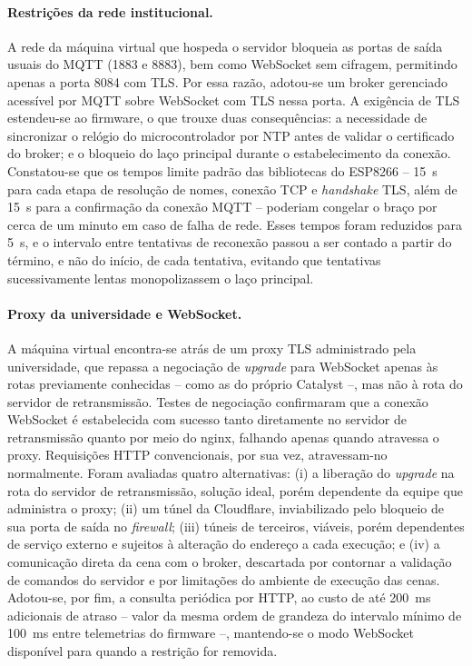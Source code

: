 \documentclass[12pt]{article}
\begin{document}
\paragraph{Restrições da rede institucional.} A rede da máquina virtual que hospeda o servidor bloqueia as portas de saída usuais do MQTT (1883 e 8883), bem como WebSocket sem cifragem, permitindo apenas a porta 8084 com TLS. Por essa razão, adotou-se um broker gerenciado acessível por MQTT sobre WebSocket com TLS nessa porta. A exigência de TLS estendeu-se ao firmware, o que trouxe duas consequências: a necessidade de sincronizar o relógio do microcontrolador por NTP antes de validar o certificado do broker; e o bloqueio do laço principal durante o estabelecimento da conexão. Constatou-se que os tempos limite padrão das bibliotecas do ESP8266 -- 15~s para cada etapa de resolução de nomes, conexão TCP e \textit{handshake} TLS, além de 15~s para a confirmação da conexão MQTT -- poderiam congelar o braço por cerca de um minuto em caso de falha de rede. Esses tempos foram reduzidos para 5~s, e o intervalo entre tentativas de reconexão passou a ser contado a partir do término, e não do início, de cada tentativa, evitando que tentativas sucessivamente lentas monopolizassem o laço principal.

\paragraph{Proxy da universidade e WebSocket.} A máquina virtual encontra-se atrás de um proxy TLS administrado pela universidade, que repassa a negociação de \textit{upgrade} para WebSocket apenas às rotas previamente conhecidas -- como as do próprio Catalyst --, mas não à rota do servidor de retransmissão. Testes de negociação confirmaram que a conexão WebSocket é estabelecida com sucesso tanto diretamente no servidor de retransmissão quanto por meio do nginx, falhando apenas quando atravessa o proxy. Requisições HTTP convencionais, por sua vez, atravessam-no normalmente. Foram avaliadas quatro alternativas: (i) a liberação do \textit{upgrade} na rota do servidor de retransmissão, solução ideal, porém dependente da equipe que administra o proxy; (ii) um túnel da Cloudflare, inviabilizado pelo bloqueio de sua porta de saída no \textit{firewall}; (iii) túneis de terceiros, viáveis, porém dependentes de serviço externo e sujeitos à alteração do endereço a cada execução; e (iv) a comunicação direta da cena com o broker, descartada por contornar a validação de comandos do servidor e por limitações do ambiente de execução das cenas. Adotou-se, por fim, a consulta periódica por HTTP, ao custo de até 200~ms adicionais de atraso -- valor da mesma ordem de grandeza do intervalo mínimo de 100~ms entre telemetrias do firmware --, mantendo-se o modo WebSocket disponível para quando a restrição for removida.
\end{document}
